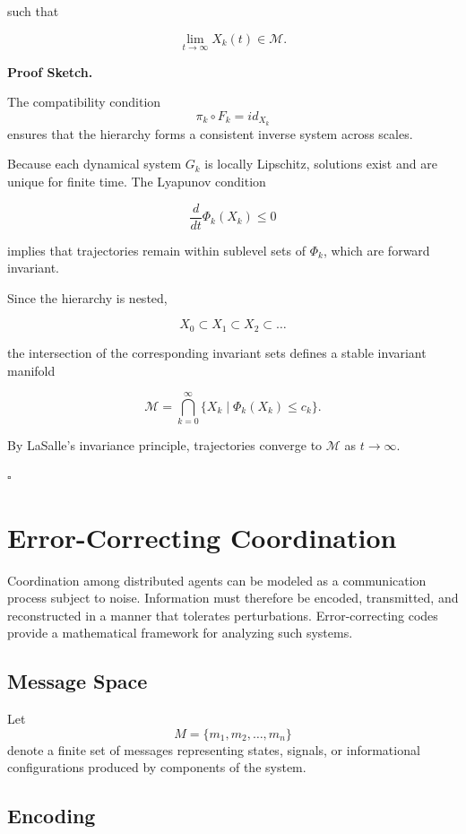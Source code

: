\documentclass[12pt]{article}
\begin{document}
such that

\[
\lim_{t \to \infty} X_k(t) \in \mathcal{M}.
\]

\textbf{Proof Sketch.}

The compatibility condition
\[
\pi_k \circ F_k = id_{X_k}
\]
ensures that the hierarchy forms a consistent inverse system across scales.

Because each dynamical system $G_k$ is locally Lipschitz, solutions exist and are unique for finite time. The Lyapunov condition

\[
\frac{d}{dt}\Phi_k(X_k) \le 0
\]

implies that trajectories remain within sublevel sets of $\Phi_k$, which are forward invariant.

Since the hierarchy is nested,

\[
X_0 \subset X_1 \subset X_2 \subset \dots
\]

the intersection of the corresponding invariant sets defines a stable invariant manifold

\[
\mathcal{M} = \bigcap_{k=0}^{\infty} \{ X_k \mid \Phi_k(X_k) \le c_k \}.
\]

By LaSalle's invariance principle, trajectories converge to $\mathcal{M}$ as $t \to \infty$.

\hfill $\square$

\section{Error-Correcting Coordination}

Coordination among distributed agents can be modeled as a communication process subject to noise. Information must therefore be encoded, transmitted, and reconstructed in a manner that tolerates perturbations. Error-correcting codes provide a mathematical framework for analyzing such systems.

\subsection{Message Space}

Let
\[
M = \{m_1, m_2, \dots, m_n\}
\]
denote a finite set of messages representing states, signals, or informational configurations produced by components of the system.

\subsection{Encoding}
\end{document}
